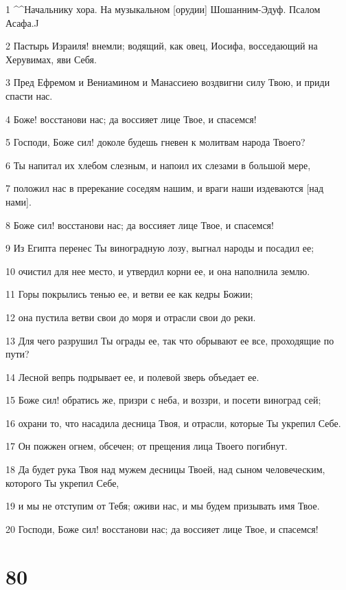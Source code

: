 \par 1 ^^Начальнику хора. На музыкальном [орудии] Шошанним-Эдуф. Псалом Асафа.^^
\par 2 Пастырь Израиля! внемли; водящий, как овец, Иосифа, восседающий на Херувимах, яви Себя.
\par 3 Пред Ефремом и Вениамином и Манассиею воздвигни силу Твою, и приди спасти нас.
\par 4 Боже! восстанови нас; да воссияет лице Твое, и спасемся!
\par 5 Господи, Боже сил! доколе будешь гневен к молитвам народа Твоего?
\par 6 Ты напитал их хлебом слезным, и напоил их слезами в большой мере,
\par 7 положил нас в пререкание соседям нашим, и враги наши издеваются [над нами].
\par 8 Боже сил! восстанови нас; да воссияет лице Твое, и спасемся!
\par 9 Из Египта перенес Ты виноградную лозу, выгнал народы и посадил ее;
\par 10 очистил для нее место, и утвердил корни ее, и она наполнила землю.
\par 11 Горы покрылись тенью ее, и ветви ее как кедры Божии;
\par 12 она пустила ветви свои до моря и отрасли свои до реки.
\par 13 Для чего разрушил Ты ограды ее, так что обрывают ее все, проходящие по пути?
\par 14 Лесной вепрь подрывает ее, и полевой зверь объедает ее.
\par 15 Боже сил! обратись же, призри с неба, и воззри, и посети виноград сей;
\par 16 охрани то, что насадила десница Твоя, и отрасли, которые Ты укрепил Себе.
\par 17 Он пожжен огнем, обсечен; от прещения лица Твоего погибнут.
\par 18 Да будет рука Твоя над мужем десницы Твоей, над сыном человеческим, которого Ты укрепил Себе,
\par 19 и мы не отступим от Тебя; оживи нас, и мы будем призывать имя Твое.
\par 20 Господи, Боже сил! восстанови нас; да воссияет лице Твое, и спасемся!

\chapter{80}

